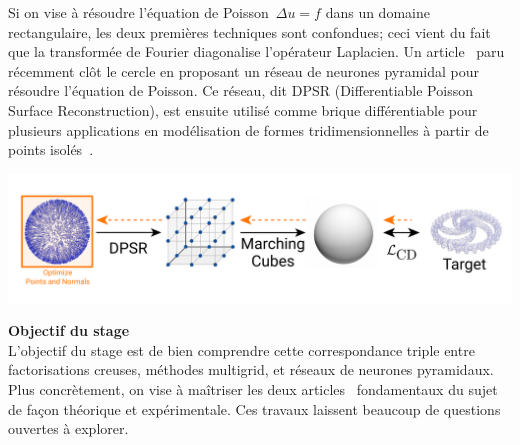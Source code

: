 \documentclass[a4paper,11pt]{article}
\begin{document}
Si on vise à résoudre l'équation de Poisson~$\Delta u = f$ dans un domaine
rectangulaire, les deux premières techniques sont confondues; ceci vient du
fait que la transformée de Fourier diagonalise l'opérateur Laplacien.
Un article~\cite{sap} paru récemment
clôt le cercle en proposant un réseau
de neurones pyramidal pour résoudre l'équation de Poisson.
Ce réseau, dit DPSR (Differentiable Poisson Surface Reconstruction), est ensuite
utilisé comme brique différentiable pour plusieurs applications en modélisation
de formes tridimensionnelles à partir de points isolés~\cite{psr}.
\\
\centerline{%
	\includegraphics[width=0.8\linewidth]{f/pipeline_optim.png}%
}



{\bf Objectif du stage}\\
L'objectif du stage est de bien comprendre cette
correspondance triple entre factorisations creuses, méthodes multigrid, et
réseaux de neurones pyramidaux.  Plus concrètement, on vise à maîtriser les
deux articles~\cite{psr,sap} fondamentaux %
du sujet de façon théorique et expérimentale.
Ces travaux laissent beaucoup de questions ouvertes à explorer.
\end{document}
